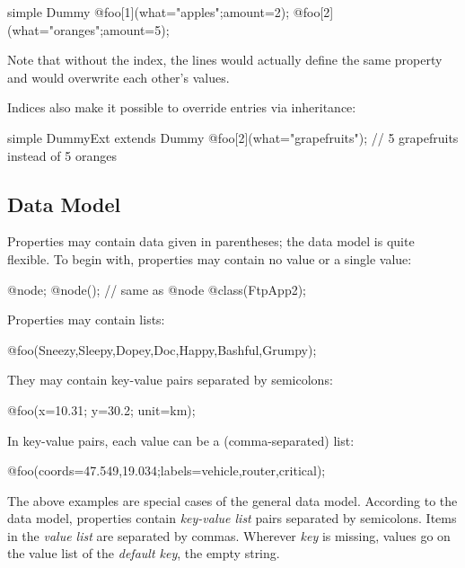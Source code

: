 \begin{ned}
simple Dummy {
    @foo[1](what="apples";amount=2);
    @foo[2](what="oranges";amount=5);
}
\end{ned}

Note that without the index, the lines would actually define the same 
property and would overwrite each other's values.

Indices also make it possible to override entries via inheritance:

\begin{ned}
simple DummyExt extends Dummy {
    @foo[2](what="grapefruits"); // 5 grapefruits instead of 5 oranges
}
\end{ned}


\subsection{Data Model}
\label{sec:ned-lang:property-data-model}

Properties may contain data given in parentheses; the data model is quite
flexible. To begin with, properties may contain no value or a single value:

\begin{ned}
@node;
@node(); // same as @node
@class(FtpApp2);
\end{ned}

Properties may contain lists:

\begin{ned}
@foo(Sneezy,Sleepy,Dopey,Doc,Happy,Bashful,Grumpy);
\end{ned}

They may contain key-value pairs separated by semicolons:

\begin{ned}
@foo(x=10.31; y=30.2; unit=km);
\end{ned}

In key-value pairs, each value can be a (comma-separated) list:

\begin{ned}
@foo(coords=47.549,19.034;labels=vehicle,router,critical);
\end{ned}

The above examples are special cases of the general data model. According to the
data model, properties contain \textit{key-value list} pairs separated by
semicolons. Items in the \textit{value list} are separated by commas. Wherever
\textit{key} is missing, values go on the value list of the \textit{default
key}, the empty string.

